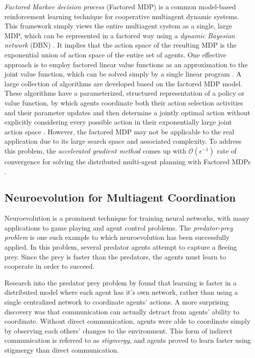\documentclass[conference]{IEEEtran}
\begin{document}
\textit{Factored Markov decision process} (Factored MDP) is a common model-based
reinforcement learning technique for cooperative multiagent dynamic systems.
This framework simply views the entire multiagent system as a single, large
MDP, which can be represented in a factored way using a \textit{dynamic Bayesian
    network} (DBN) \cite{guestrin2001multiagent}. 
It implies that the action space of the resulting MDP is the exponential union
of action space of the entire set of agents. 
One effective approach is to employ factored linear value functions as an
approximation to the joint value function, which can be solved simply by a
single linear program \cite{guestrin2001multiagent}. 
A large collection of algorithms are developed based on the factored MDP model. 
These algorithms have a parameterized, structured representation of a policy
or value function, by which agents coordinate both their action selection
activities and their parameter updates and then determine a jointly optimal
action without explicitly considering every possible action in their
exponentially large joint action space \cite{guestrin2002coordinated}. 
However, the factored MDP may not be applicable to the real application due to
its large search space and associated complexity.
To address this problem, the \textit{accelerated gradient method} comes up with
$\mathcal{O}(\epsilon^{-1})$ rate of convergence for solving the distributed
multi-agent planning with Factored MDPs \cite{suegeo2011accgrad}.

\subsection{Neuroevolution for Multiagent Coordination}
Neuroevolution is a prominent technique for training neural networks, with many applications to game playing and agent control problems.
The \textit{predator-prey problem} is one such example to which neuroevolution has been successfully applied. In this problem, several predator agents attempt to capture a fleeing prey. Since the prey is faster than the predators, the agents must learn to cooperate in order to succeed.

Research into the predator prey problem by \cite{yong2001cooperative} found that learning is faster in a distributed model where each agent has it's own network, rather than using a single centralized network to coordinate agents' actions.
A more surprising discovery was that communication can actually detract from agents' ability to coordinate. 
Without direct communication, agents were able to coordinate simply by observing each others' changes to the environment. This form of indirect communication is referred to as \textit{stigmergy}, and agents proved to learn faster using stigmergy than direct communication. 
\end{document}
